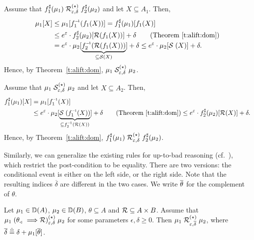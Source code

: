 \documentclass{lmcs}
\begin{document}
\proofatend
\begin{description}[style=unboxed,leftmargin=0cm]
\item[($\Longrightarrow$)]
  Assume that
  $f_1^{\sharp}(\mu_1) \mathrel{\mathrel{\mathcal{R}}^{(\star)}_{\varepsilon,\delta}} f_2^{\sharp}(\mu_2)$
  and let $X \subseteq A_1$. Then,
  \begin{align*}
    \mu_1[X]
      &\leq \mu_1[\inv{f_1}(f_1(X))] = \dlift{f_1}(\mu_1)[f_1(X)] \\
      &\leq e^{\epsilon} \cdot \dlift{f_2}(\mu_2)[\oR(f_1(X))] + \delta
         \tag{Theorem~\ref{t:alift:dom}} \\
      &= e^{\epsilon} \cdot \mu_2[\underbrace{%
           \inv{f_2}(\oR(f_1(X)))}_{\subseteq \rS(X)}]
           + \delta
       \leq e^{\epsilon} \cdot \mu_2[\rS(X)] + \delta .
  \end{align*}
  Hence, by Theorem~\ref{t:alift:dom},
  $\mu_1 \mathrel{\mathrel{\mathcal{S}}^{(\star)}_{\varepsilon,\delta}} \mu_2$.

\item[($\Longleftarrow$)]
  Assume that
  $\mu_1 \mathrel{\mathrel{\mathcal{S}}^{(\star)}_{\varepsilon,\delta}} \mu_2$
  and let $X \subseteq A_2$. Then,
  \begin{align*}
    \dlift{f_1}(\mu_1)[X]
      &= \mu_1[\inv{f_1}(X)] \\
      &\leq e^{\epsilon} \cdot \mu_2[\underbrace{%
           \rS(\inv{f_1}(X))}_{%
             \subseteq \inv{f_2}(\oR(X))}
         ] + \delta
        \tag{Theorem~\ref{t:alift:dom}}
       \leq e^{\epsilon} \cdot \dlift{f_2}(\mu_2)[\oR(X)] + \delta .
  \end{align*}
  Hence, by Theorem~\ref{t:alift:dom},
  $f_1^{\sharp}(\mu_1) \mathrel{\mathrel{\mathcal{R}}^{(\star)}_{\varepsilon,\delta}} f_2^{\sharp}(\mu_2)$.
  \qedhere
\end{description}
\endproofatend

Similarly, we can generalize the existing rules for up-to-bad reasoning (cf.\
\citet[Theorem 13]{BartheFGGHS16}), which restrict the post-condition to be
equality. There are two versions: the conditional event is either on the left
side, or the right side. Note that the resulting indices $\overline{\delta}$ are
different in the two cases. We write $\overline{\theta}$ for the complement of
$\theta$.

\begin{lem} \label{l:alift:utbl}
  Let $\mu_1 \in {\mathbb{D}}(A)$, $\mu_2 \in {\mathbb{D}}(B)$, $\theta \subseteq A$
  and $\mathcal{R} \subseteq A \times B$. Assume that
  $\mu_1 \mathrel{(\theta_{\mspace{-1.5mu}{\scriptscriptstyle \vartriangleleft}} \implies \mathrel{\mathcal{R}})^{(\star)}_{\varepsilon,\delta}} \mu_2$
  for some parameters $\epsilon, \delta \geq 0$.
  Then $\mu_1 \mathrel{\mathrel{\mathcal{R}}^{(\star)}_{\varepsilon,\overline{\delta}}} \mu_2$,
  where $\overline{\delta} \mathrel{\stackrel{\scriptscriptstyle \triangle}{=}} \delta + \mu_1[\overline{\theta}]$.
\end{lem}
\end{document}
